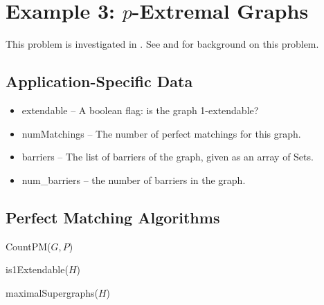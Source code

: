 \documentclass[11pt]{article}
\begin{document}
\section{Example 3: $p$-Extremal Graphs}

This problem is investigated in \cite{pExtremal}.
See \cite{DudekSchmitt} and \cite{HSWY} for background on this problem.

\subsection{Application-Specific Data}

\begin{itemize}

	\item extendable -- A boolean flag: is the graph 1-extendable?

	\item numMatchings -- The number of perfect matchings for this graph.

	\item barriers -- The list of barriers of the graph, given as an array of Sets.

	\item num\_barriers -- the number of barriers in the graph.

\end{itemize}

\subsection{Perfect Matching Algorithms}

\begin{algorithm}[h]
	\caption{\label{alg:countpm}CountPM($G, P$)}
	\begin{algorithmic}
		\STATE
	\end{algorithmic}
\end{algorithm}

\begin{algorithm}[h]
	\caption{\label{alg:is1Extendable}is1Extendable($H$)}
	\begin{algorithmic}
		\STATE
	\end{algorithmic}
\end{algorithm}

\begin{algorithm}[h]
	\caption{\label{alg:maximalSupergraphs}maximalSupergraphs($H$)}
	\begin{algorithmic}
		\STATE
	\end{algorithmic}
\end{algorithm}
\end{document}
